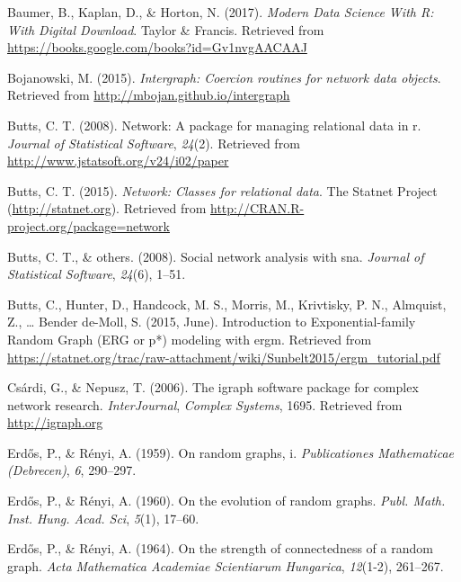 \documentclass[12pt,twoside]{amherstthesis}
\begin{document}
  \noindent
  
  \setlength{\parindent}{-0.20in} \setlength{\leftskip}{0.20in}
  \setlength{\parskip}{8pt}
  
  \hypertarget{refs}{}
  \hypertarget{ref-baumer_modern_2017}{}
  Baumer, B., Kaplan, D., \& Horton, N. (2017). \emph{Modern Data Science
  With R: With Digital Download}. Taylor \& Francis. Retrieved from
  \url{https://books.google.com/books?id=Gv1nvgAACAAJ}
  
  \hypertarget{ref-intergraphpackagemanual}{}
  Bojanowski, M. (2015). \emph{Intergraph: Coercion routines for network
  data objects}. Retrieved from \url{http://mbojan.github.io/intergraph}
  
  \hypertarget{ref-networkpackagearticle}{}
  Butts, C. T. (2008). Network: A package for managing relational data in
  r. \emph{Journal of Statistical Software}, \emph{24}(2). Retrieved from
  \url{http://www.jstatsoft.org/v24/i02/paper}
  
  \hypertarget{ref-networkpackagemanual}{}
  Butts, C. T. (2015). \emph{Network: Classes for relational data}. The
  Statnet Project (\url{http://statnet.org}). Retrieved from
  \url{http://CRAN.R-project.org/package=network}
  
  \hypertarget{ref-butts2008social}{}
  Butts, C. T., \& others. (2008). Social network analysis with sna.
  \emph{Journal of Statistical Software}, \emph{24}(6), 1--51.
  
  \hypertarget{ref-butts_introduction_2015}{}
  Butts, C., Hunter, D., Handcock, M. S., Morris, M., Krivtisky, P. N.,
  Almquist, Z., \ldots{} Bender de-Moll, S. (2015, June). Introduction to
  Exponential-family Random Graph (ERG or p*) modeling with ergm.
  Retrieved from
  \url{https://statnet.org/trac/raw-attachment/wiki/Sunbelt2015/ergm_tutorial.pdf}
  
  \hypertarget{ref-igraphpackage}{}
  Csárdi, G., \& Nepusz, T. (2006). The igraph software package for
  complex network research. \emph{InterJournal}, \emph{Complex Systems},
  1695. Retrieved from \url{http://igraph.org}
  
  \hypertarget{ref-erdos1959random}{}
  Erd\H{o}s, P., \& Rényi, A. (1959). On random graphs, i.
  \emph{Publicationes Mathematicae (Debrecen)}, \emph{6}, 290--297.
  
  \hypertarget{ref-erdos1960evolution}{}
  Erd\H{o}s, P., \& Rényi, A. (1960). On the evolution of random graphs.
  \emph{Publ. Math. Inst. Hung. Acad. Sci}, \emph{5}(1), 17--60.
  
  \hypertarget{ref-erdHos1964strength}{}
  Erd\H{o}s, P., \& Rényi, A. (1964). On the strength of connectedness of
  a random graph. \emph{Acta Mathematica Academiae Scientiarum Hungarica},
  \emph{12}(1-2), 261--267.
  
\end{document}
